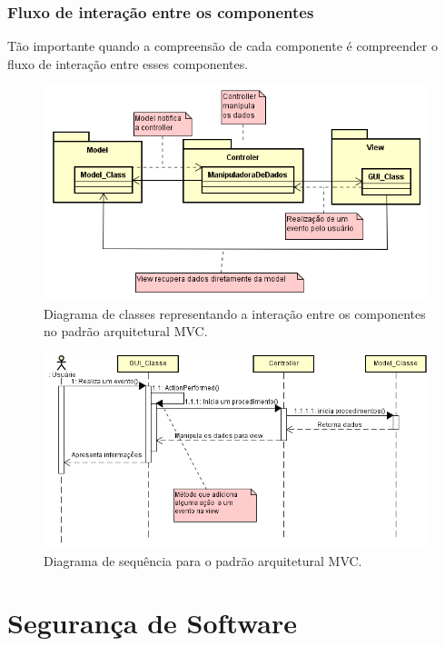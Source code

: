 \subsubsection{Fluxo de interação entre os componentes}

Tão importante quando a compreensão de cada componente é compreender o fluxo de interação entre esses componentes. 


\begin{figure}[h!]
	\centering
	\includegraphics[keepaspectratio=true,scale=1.0]{figuras/DiagramaDeClasseMVC.PNG}
	\caption{Diagrama de classes representando a interação entre os componentes no padrão arquitetural MVC.}
	\label{DiagramaDeClasseMVC}
\end{figure}

\begin{figure}[h!]
	\centering
	\includegraphics[keepaspectratio=true,scale=0.8]{figuras/DiagramaDeSequenciaMVC.PNG}
	\caption{Diagrama de sequência para o padrão arquitetural MVC.}
	\label{DiagramaDeSequenciaMVC}
\end{figure}



\section{Segurança de Software}
\label{sec:seguranca}

